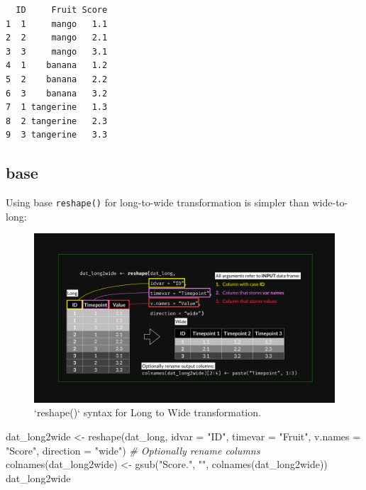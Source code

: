 \documentclass[
]{book}
\newenvironment{Shaded}{\begin{snugshade}}{\end{snugshade}}
\newcommand{\AttributeTok}[1]{\textcolor[rgb]{0.77,0.63,0.00}{#1}}
\newcommand{\CommentTok}[1]{\textcolor[rgb]{0.56,0.35,0.01}{\textit{#1}}}
\newcommand{\FunctionTok}[1]{\textcolor[rgb]{0.00,0.00,0.00}{#1}}
\newcommand{\NormalTok}[1]{#1}
\newcommand{\OtherTok}[1]{\textcolor[rgb]{0.56,0.35,0.01}{#1}}
\newcommand{\StringTok}[1]{\textcolor[rgb]{0.31,0.60,0.02}{#1}}
\begin{document}
\begin{verbatim}
  ID     Fruit Score
1  1     mango   1.1
2  2     mango   2.1
3  3     mango   3.1
4  1    banana   1.2
5  2    banana   2.2
6  3    banana   3.2
7  1 tangerine   1.3
8  2 tangerine   2.3
9  3 tangerine   3.3
\end{verbatim}

\hypertarget{base-1}{%
\subsection{base}\label{base-1}}

Using base \texttt{reshape()} for long-to-wide transformation is simpler than wide-to-long:

\begin{figure}

{\centering \includegraphics[width=1\linewidth]{R_reshape_long2wide} 

}

\caption{`reshape()` syntax for Long to Wide transformation.}\label{fig:longWideSyntax}
\end{figure}

\begin{Shaded}
\begin{Highlighting}[]
\NormalTok{dat\_long2wide }\OtherTok{\textless{}{-}} \FunctionTok{reshape}\NormalTok{(dat\_long,}
                         \AttributeTok{idvar =} \StringTok{"ID"}\NormalTok{,}
                         \AttributeTok{timevar =} \StringTok{"Fruit"}\NormalTok{,}
                         \AttributeTok{v.names =} \StringTok{"Score"}\NormalTok{,}
                         \AttributeTok{direction =} \StringTok{"wide"}\NormalTok{)}
\CommentTok{\# Optionally rename columns}
\FunctionTok{colnames}\NormalTok{(dat\_long2wide) }\OtherTok{\textless{}{-}} \FunctionTok{gsub}\NormalTok{(}\StringTok{"Score."}\NormalTok{, }\StringTok{""}\NormalTok{, }\FunctionTok{colnames}\NormalTok{(dat\_long2wide))}
\NormalTok{dat\_long2wide}
\end{Highlighting}
\end{Shaded}
\end{document}
